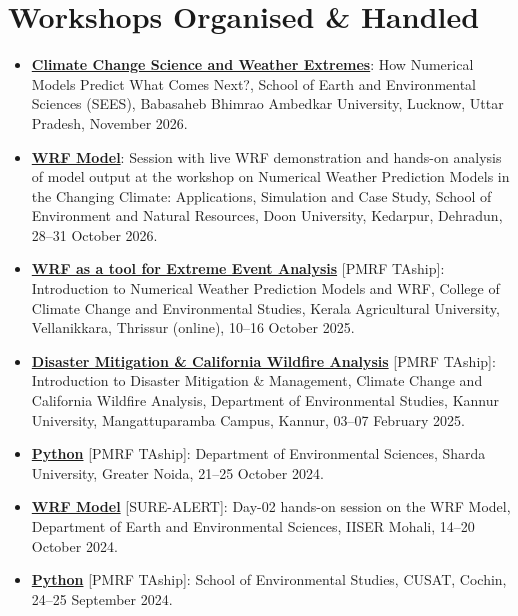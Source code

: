 \documentclass[letterpaper,11pt]{article}
\begin{document}
\section{Workshops Organised \& Handled}
\begin{justify}
      \begin{itemize}[leftmargin=*,itemsep=2pt,parsep=0pt,topsep=2pt]
        \item \small \href{https://anandu-prabhakaran.pages.dev/workshops#W_2026_02}{\textbf{Climate Change Science and Weather Extremes}}: How Numerical Models Predict What Comes Next?, School of Earth and Environmental Sciences (SEES), Babasaheb Bhimrao Ambedkar University, Lucknow, Uttar Pradesh, November 2026.
        \item \small \href{https://anandu-prabhakaran.pages.dev/workshops#W_2026_01}{\textbf{WRF Model}}: Session with live WRF demonstration and hands-on analysis of model output at the workshop on Numerical Weather Prediction Models in the Changing Climate: Applications, Simulation and Case Study, School of Environment and Natural Resources, Doon University, Kedarpur, Dehradun, 28--31 October 2026.
        \item \small \href{https://anandu-prabhakaran.pages.dev/workshops#W_2025_02}{\textbf{WRF as a tool for Extreme Event Analysis}} [PMRF TAship]: Introduction to Numerical Weather Prediction Models and WRF, College of Climate Change and Environmental Studies, Kerala Agricultural University, Vellanikkara, Thrissur (online), 10--16 October 2025.
        \item \small \href{https://anandu-prabhakaran.pages.dev/workshops#W_2025_01}{\textbf{Disaster Mitigation \& California Wildfire Analysis}} [PMRF TAship]: Introduction to Disaster Mitigation \& Management, Climate Change and California Wildfire Analysis, Department of Environmental Studies, Kannur University, Mangattuparamba Campus, Kannur, 03--07 February 2025.
        \item \small \href{https://anandu-prabhakaran.pages.dev/workshops#W_2024_05}{\textbf{Python}} [PMRF TAship]: Department of Environmental Sciences, Sharda University, Greater Noida, 21--25 October 2024.
        \item \small \href{https://anandu-prabhakaran.pages.dev/workshops#W_2024_04}{\textbf{WRF Model}} [SURE-ALERT]: Day-02 hands-on session on the WRF Model, Department of Earth and Environmental Sciences, IISER Mohali, 14--20 October 2024.
        \item \small \href{https://anandu-prabhakaran.pages.dev/workshops#W_2024_03}{\textbf{Python}} [PMRF TAship]: School of Environmental Studies, CUSAT, Cochin, 24--25 September 2024.

\end{itemize}
\end{justify}
\end{document}
